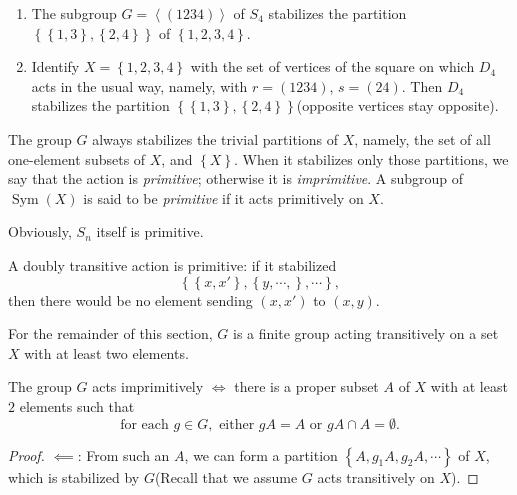 \begin{example}
  \begin{enumerate}
    \item The subgroup \( G = \left\langle (1234) \right\rangle \) of \( S_4 \) stabilizes the partition \( \left\lbrace \left\lbrace 1, 3 \right\rbrace, \left\lbrace 2, 4 \right\rbrace \right\rbrace \) of \( \left\lbrace 1, 2, 3, 4 \right\rbrace \).
    \item Identify \( X = \left\lbrace 1, 2, 3, 4 \right\rbrace \) with the set of vertices of the square on which \( D_4 \) acts in the usual way, namely, with \( r = (1234) \), \( s = (24) \).
      Then \( D_4 \) stabilizes the partition \( \left\lbrace \left\lbrace 1, 3 \right\rbrace, \left\lbrace 2, 4 \right\rbrace \right\rbrace \)(opposite vertices stay opposite).
  \end{enumerate}
\end{example}

\begin{definition}
  The group \( G \) always stabilizes the trivial partitions of \( X \), namely, the set of all one-element subsets of \( X \), and \( \left\lbrace X \right\rbrace \).
  When it stabilizes only those partitions, we say that the action is \emph{primitive}; otherwise it is \emph{imprimitive}.
  A subgroup of \( \operatorname{Sym}(X) \) is said to be \emph{primitive} if it acts primitively on \( X \).
\end{definition}
Obviously, \( S_n \) itself is primitive.

\begin{example}
  A doubly transitive action is primitive: if it stabilized
  \[
    \left\lbrace \left\lbrace x, x' \right\rbrace, \left\lbrace y, \cdots, \right\rbrace, \cdots \right\rbrace,
  \]
  then there would be no element sending \( (x, x') \) to \( (x, y) \).
\end{example}

For the remainder of this section, \( G \) is a finite group acting transitively on a set \( X \) with at least two elements.

\begin{proposition}
  The group \( G \) acts imprimitively \( \iff \) there is a proper subset \( A \) of \( X \) with at least \( 2 \) elements such that
  \begin{equation}
    \text{for each } g \in G, \text{ either } gA = A \text{ or } gA \cap A = \emptyset. \tag{*} \label{eq: block}
  \end{equation}
\end{proposition}
\begin{proof}
  \( \impliedby \): From such an \( A \), we can form a partition \( \left\lbrace A, g_1 A, g_2 A, \cdots \right\rbrace \) of \( X \), which is stabilized by \( G \)(Recall that we assume \( G  \) acts transitively on \( X \)).
\end{proof}

